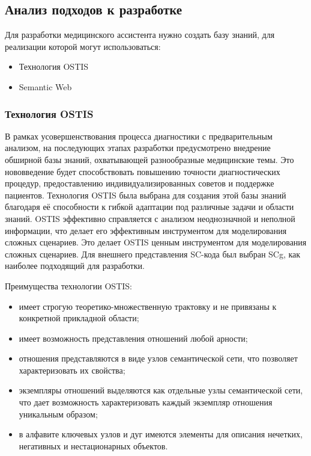 \subsection{Анализ подходов к разработке}

Для разработки медицинского ассистента нужно создать базу знаний, для реализации которой могут использоваться:

\begin{itemize}
    \item Технология OSTIS
    \item Semantic Web
\end{itemize} 

\subsubsection{Технология OSTIS}

В рамках усовершенствования процесса диагностики с предварительным анализом, на последующих этапах разработки предусмотрено внедрение обширной базы знаний, охватывающей разнообразные медицинские темы. Это нововведение будет способствовать повышению точности диагностических процедур, предоставлению индивидуализированных советов и поддержке пациентов.
Технология OSTIS была выбрана для создания этой базы знаний благодаря её способности к гибкой адаптации под различные задачи и области знаний. OSTIS эффективно справляется с анализом неоднозначной и неполной информации, что делает его эффективным инструментом для моделирования сложных сценариев. Это делает OSTIS ценным инструментом для моделирования сложных сценариев. Для внешнего представления SC-кода был выбран SCg, как наиболее подходящий для разработки.

Преимущества технологии OSTIS:
\begin{itemize}
	\item имеет строгую теоретико-множественную трактовку и не привязаны к конкретной прикладной области;
	\item имеет возможность представления отношений любой арности;
	\item отношения представляются в виде узлов семантической сети, что позволяет характеризовать их свойства;
	\item экземпляры отношений выделяются как отдельные узлы семантической сети, что дает возможность характеризовать каждый экземпляр отношения уникальным образом;
	\item в алфавите ключевых узлов и дуг имеются элементы для описания нечетких, негативных и нестационарных объектов.
\end{itemize}

